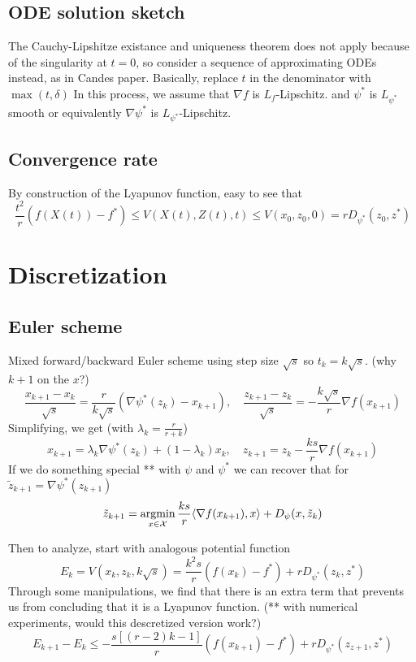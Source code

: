 \documentclass{article}
\newcommand{\argmin}{\operatornamewithlimits{argmin}}
\begin{document}
\subsection{ODE solution sketch}
The Cauchy-Lipshitze existance and uniqueness theorem does not apply because of the singularity at $t=0$, so consider a sequence of approximating ODEs instead, as in Candes paper. Basically, replace $t$ in the denominator with $\max (t,\delta)$ In this process, we assume that $\nabla f$ is $L_f$-Lipschitz. and $\psi^*$ is $L_{\psi^*}$ smooth or equivalently $\nabla \psi^*$ is $L_{\psi^*}$-Lipschitz.

\subsection{Convergence rate}
By construction of the Lyapunov function, easy to see that
\[ \frac{t^2}{r} (f(X(t)) - f^*) \leq V(X(t),Z(t),t) \leq  V(x_0,z_0,0)  = rD_{\psi^*}(z_0,z^*) \]

\section{Discretization}
\subsection{Euler scheme}
Mixed forward/backward Euler scheme using step size $\sqrt{s}$ so $t_k = k\sqrt{s}$. (why $k+1$ on the $x$?)
\[ \frac{x_{k+1} - x_k}{\sqrt{s}} = \frac{r}{k\sqrt{s}} (\nabla \psi^*(z_k) - x_{k+1}),\quad \frac{z_{k+1} - z_k}{\sqrt{s}} = -\frac{k\sqrt{s}}{r} \nabla f(x_{k+1}) \]
Simplifying, we get (with $\lambda_k = \frac{r}{r+k}$)
\[ x_{k+1}  = \lambda_k \nabla \psi^*(z_k) + (1-\lambda_k) x_{k}, \quad z_{k+1} = z_k -\frac{ks}{r} \nabla f(x_{k+1}) \]
If we do something special ** with $\psi$ and $\psi^*$ we can recover that for $\tilde z_{k+1} = \nabla \psi^*(z_{k+1} )$
\[ \tilde z_{k+1} = \argmin_{x\in\mathcal{X}} \frac{ks}{r} \langle \nabla f(x_{k+1}), x \rangle + D_\psi (x, \tilde z_k)\]

Then to analyze, start with analogous potential function
\[E_k = V(x_k, z_k, k\sqrt{s}) = \frac{k^2s}{r} (f(x_k) - f^*) + rD_{\psi^*}(z_k,z^*)\]
Through some manipulations, we find that there is an extra term that prevents us from concluding that it is a Lyapunov function. (** with numerical experiments, would this descretized version work?)
\[ E_{k+1} - E_k \leq -\frac{s[(r-2)k-1]}{r} (f(x_{k+1}) - f^*) + rD_{\psi^*}(z_{z+1},z^*) \]
\end{document}
